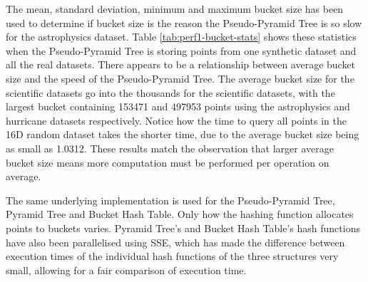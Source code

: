 The mean, standard deviation, minimum and maximum bucket size has been used to determine if bucket size is the reason the Pseudo-Pyramid Tree is so slow for the astrophysics dataset. Table \ref{tab:perf1-bucket-stats} shows these statistics when the Pseudo-Pyramid Tree is storing points from one synthetic dataset and all the real datasets. There appears to be a relationship between average bucket size and the speed of the Pseudo-Pyramid Tree. The average bucket size for the scientific datasets go into the thousands for the scientific datasets, with the largest bucket containing 153471 and 497953 points using the astrophysics and hurricane datasets respectively. Notice how the time to query all points in the 16D random dataset takes the shorter time, due to the average bucket size being as small as 1.0312. These results match the observation that larger average bucket size means more computation must be performed per operation on average.


The same underlying implementation is used for the Pseudo-Pyramid Tree, Pyramid Tree and Bucket Hash Table. Only how the hashing function allocates points to buckets varies. Pyramid Tree's and Bucket Hash Table's hash functions have also been parallelised using SSE, which has made the difference between execution times of the individual hash functions of the three structures very small, allowing for a fair comparison of execution time.

